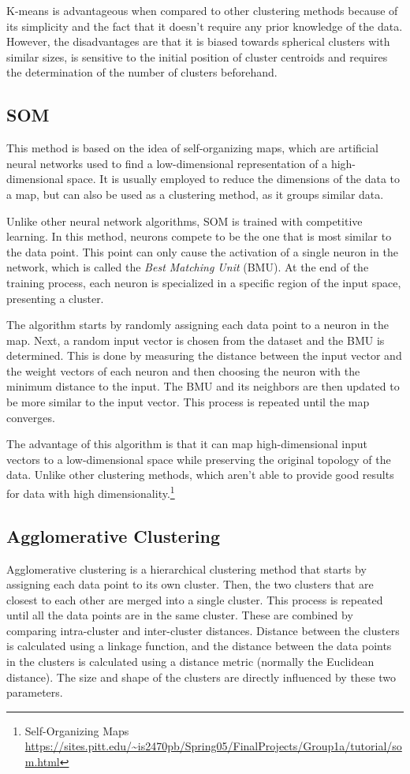 K-means is advantageous when compared to other clustering methods because of its simplicity and the fact that it doesn't require any prior knowledge of the data. However, the disadvantages are that it is biased towards spherical clusters with similar sizes, is sensitive to the initial position of cluster centroids and requires the determination of the number of clusters beforehand.

\subsection{SOM}\label{sec:som}
This method is based on the idea of self-organizing maps, which are artificial neural networks used to find a low-dimensional representation of a high-dimensional space. It is usually employed to reduce the dimensions of the data to a map, but can also be used as a clustering method, as it groups similar data. 

Unlike other neural network algorithms, SOM is trained with competitive learning. In this method, neurons compete to be the one that is most similar to the data point. This point can only cause the activation of a single neuron in the network, which is called the \textit{Best Matching Unit} (BMU). At the end of the training process, each neuron is specialized in a specific region of the input space, presenting a cluster.

The algorithm starts by randomly assigning each data point to a neuron in the map. Next, a random input vector is chosen from the dataset and the BMU is determined. This is done by measuring the distance between the input vector and the weight vectors of each neuron and then choosing the neuron with the minimum distance to the input. The BMU and its neighbors are then updated to be more similar to the input vector. This process is repeated until the map converges. 


The advantage of this algorithm is that it can map high-dimensional input vectors to a low-dimensional space while preserving the original topology of the data. Unlike other clustering methods, which aren't able to provide good results for data with high dimensionality.\footnote{Self-Organizing Maps \url{https://sites.pitt.edu/~is2470pb/Spring05/FinalProjects/Group1a/tutorial/som.html}}

\subsection{Agglomerative Clustering}\label{sec:aglomerative}
Agglomerative clustering is a hierarchical clustering method that starts by assigning each data point to its own cluster. Then, the two clusters that are closest to each other are merged into a single cluster. This process is repeated until all the data points are in the same cluster. These are combined by comparing intra-cluster and inter-cluster distances. Distance between the clusters is calculated using a linkage function, and the distance between the data points in the clusters is calculated using a distance metric (normally the Euclidean distance). The size and shape of the clusters are directly influenced by these two parameters.


